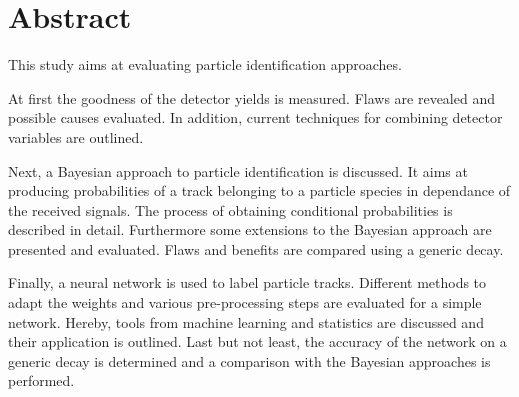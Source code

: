 \chapter*{Abstract}

This study aims at evaluating particle identification approaches.

At first the goodness of the detector yields is measured. Flaws are revealed and possible causes evaluated. In addition, current techniques for combining detector variables are outlined.

Next, a Bayesian approach to particle identification is discussed. It aims at producing probabilities of a track belonging to a particle species in dependance of the received signals. The process of obtaining conditional probabilities is described in detail. Furthermore some extensions to the Bayesian approach are presented and evaluated. Flaws and benefits are compared using a generic decay.

Finally, a neural network is used to label particle tracks. Different methods to adapt the weights and various pre-processing steps are evaluated for a simple network. Hereby, tools from machine learning and statistics are discussed and their application is outlined. Last but not least, the accuracy of the network on a generic decay is determined and a comparison with the Bayesian approaches is performed.
